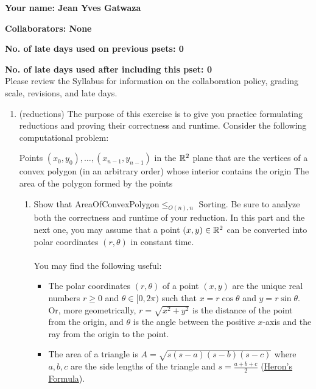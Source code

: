 \documentclass[11pt]{article}
\begin{document}

\textbf{Your name: Jean Yves Gatwaza}

\textbf{Collaborators: None }

\textbf{No. of late days used on previous psets: 0}

\textbf{No. of late days used after including this pset: 0 }
\\

Please review the Syllabus for information on the collaboration 
policy, grading scale, revisions, and late days.


\begin{enumerate}
     \item  (reductions) The purpose of this exercise is to give you practice formulating reductions and proving their correctness and runtime.
    Consider the following computational problem:

    {Points $(x_0,y_0),\ldots,(x_{n-1},y_{n-1})$ in the $\mathbb{R}^2$ plane that are the vertices of a convex polygon (in an arbitrary order) whose interior contains the origin}
    {The area of the polygon formed by the points}


    \begin{enumerate}
        \item \label{part:polar} 
        Show that AreaOfConvexPolygon$\leq_{O(n),n}$ Sorting.  Be sure to analyze both the correctness and runtime of your reduction.
        In this part and the next one, you may assume that a point $(x,y)\in \mathbb{R}^2$ can be converted into polar coordinates $(r,\theta)$ in constant time. 
        \\\\
        You may find the following useful:
        \begin{itemize}
            \item The polar coordinates $(r,\theta)$ of a point $(x,y)$ are the unique real numbers $r\geq 0$ and $\theta\in [0,2\pi)$ such that $x=r\cos \theta$ and $y=r\sin \theta$. Or, more geometrically, $r=\sqrt{x^2+y^2}$ is the distance of the point from the origin, and $\theta$ is the angle between the positive $x$-axis and the ray from the origin to the point.
            \item The area of a triangle is $A = \sqrt{s(s-a)(s-b)(s-c)}$ where $a, b, c$ are the side lengths of the triangle and $s = \frac{a + b + c}{2}$ (\href{https://en.wikipedia.org/wiki/Heron\%27s_formula}{Heron's Formula}).
        \end{itemize}
        

\end{enumerate}
\end{enumerate}
\end{document}
